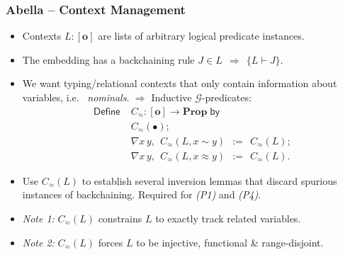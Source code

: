 \documentclass[english,pdftex,dvipsnames,leqno,handout]{beamer}%
\newcommand{\hl}[1]{\emph{\color{sbmcyan} #1}}
\newcommand{\ms}{\;\,}
\newcommand{\mbin}[1]{\mathbin{\ms #1 \ms}}
\newcommand{\mrel}[1]{\mathrel{\ms #1 \ms}} %
\newcommand{\mImpl}{\mrel{\Rightarrow}}
\newcommand{\eqdef}{\mbin{:=}}
\newcommand{\of}{\mathbin{:}}
\newcommand{\tyrel}[2]{\ensuremath{#1 \mathrel{\sim} #2}}
\newcommand{\tmrel}[2]{\ensuremath{#1 \mathrel{\approx} #2}}
\newcommand{\lpProp}{\ensuremath{\mathbf{o}}}
\newcommand{\gProp}{\ensuremath{\mathbf{Prop}}}
\begin{document}
\begin{frame}
  \frametitle{Abella -- Context Management}
  \begin{itemize}
  \item Contexts $L \of [\lpProp]$ are lists of arbitrary logical predicate instances.
  \item The embedding has a backchaining rule \hl{$J \in L \mImpl \{L \vdash J\}$}.
  \item We want typing/relational contexts that only contain information about variables, i.e.\ \hl{nominals}. $\Rightarrow$ Inductive $\mathcal{G}$-predicates:
    {\color{greenblue}\begin{align*}
                        \mathsf{Define}\; &C_\approx \of [\lpProp] \to \gProp\;\mathsf{by}\\
                                          &C_\approx(\bullet);\\
                                          &\nabla x\,y,\ms C_\approx(L, \tyrel{x}{y}) \eqdef C_\approx(L);\\
                                          &\nabla x\,y,\ms C_\approx(L, \tmrel{x}{y}) \eqdef C_\approx(L).
    \end{align*}}\vspace{-1.6em}
    \item Use {\color{greenblue}$C_\approx(L)$} to establish several inversion lemmas that discard spurious instances of backchaining. Required for \hl{(P1)} and \hl{(P4)}.
    \item \hl{Note 1:} {\color{greenblue}$C_\approx(L)$} constrains $L$ to exactly track related variables.
    \item \hl{Note 2:} {\color{greenblue}$C_\approx(L)$} forces $L$ to be injective, functional \& range-disjoint.
  \end{itemize}
\end{frame}
\end{document}
